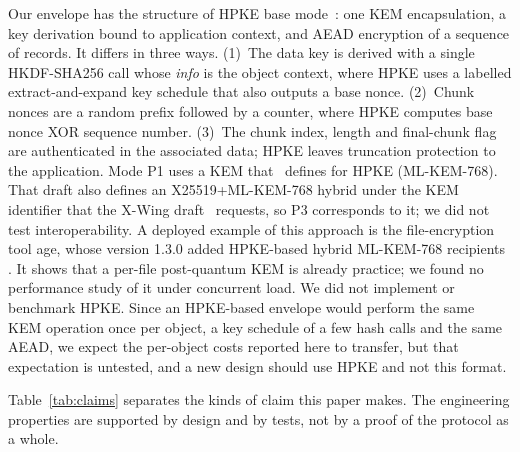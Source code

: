 \documentclass[review,12pt]{elsarticle}
\begin{document}
Our envelope has the structure of HPKE base mode~\cite{rfc9180}: one KEM encapsulation, a key
derivation bound to application context, and AEAD encryption of a sequence of records. It
differs in three ways. (1)~The data key is derived with a single HKDF-SHA256 call whose
\emph{info} is the object context, where HPKE uses a labelled extract-and-expand key schedule
that also outputs a base nonce. (2)~Chunk nonces are a random prefix followed by a counter, where
HPKE computes base nonce XOR sequence number. (3)~The chunk index, length and final-chunk flag
are authenticated in the associated data; HPKE leaves truncation protection to the application.
Mode P1 uses a KEM that~\cite{hpkepq} defines for HPKE (ML-KEM-768). That draft also defines an
X25519+ML-KEM-768 hybrid under the KEM identifier that the X-Wing draft~\cite{xwing} requests,
so P3 corresponds to it; we did not test interoperability. A deployed example of this approach is
the file-encryption tool age, whose version 1.3.0 added HPKE-based hybrid ML-KEM-768 recipients
\cite{age2025}. It shows that a per-file post-quantum KEM is already practice; we found no
performance study of it under concurrent load. We did not
implement or benchmark HPKE. Since an HPKE-based envelope would perform the same KEM operation
once per object, a key schedule of a few hash calls and the same AEAD, we expect the per-object
costs reported here to transfer, but that expectation is untested, and a new design should use
HPKE and not this format.

Table~\ref{tab:claims} separates the kinds of claim this paper makes. The engineering properties
are supported by design and by tests, not by a proof of the protocol as a whole.
\end{document}
